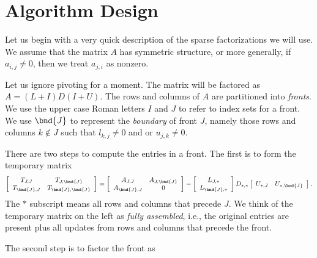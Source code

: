 \par
\chapter{Algorithm Design}
\label{chapter:algorithmDesign}
\par
Let us begin with a very quick description of the sparse
factorizations we will use.
We assume that the matrix $A$ has symmetric structure, or more
generally, if $a_{i,j} \ne 0$, then we treat $a_{j,i}$ as nonzero.
\par
Let us ignore pivoting for a moment.
The matrix will be factored as $A = (L+I)D(I+U)$.
The rows and columns of $A$ are partitioned into {\it fronts}.
We use the upper case Roman letters $I$ and $J$ to refer to
index sets for a front.
We use $\bnd{J}$ to represent the {\it boundary} of front $J$,
namely those rows and columns $k \notin J$ 
such that $l_{k,j} \ne 0$ and or $u_{j,k} \ne 0$.
\par
There are two steps to compute the entries in a front.
The first is to form the temporary matrix
\begin{equation}
\label{alg:eqn:1}
\left \lbrack \begin{array}{cc}
T_{J,J} & T_{J, \bnd{J}} \\
T_{\bnd{J},J} & T_{\bnd{J},\bnd{J}}
\end{array} \right \rbrack
=
\left \lbrack \begin{array}{cc}
A_{J,J} & A_{J, \bnd{J}} \\
A_{\bnd{J},J} & 0
\end{array} \right \rbrack
-
\left \lbrack \begin{array}{c}
L_{J,*} \\
L_{\bnd{J},*}
\end{array} \right \rbrack
D_{*,*} 
\left \lbrack \begin{array}{cc}
U_{*,J} & U_{*,\bnd{J}}
\end{array} \right \rbrack.
\end{equation}
The $*$ subscript means all rows and columns that precede $J$.
We think of the temporary matrix on the left
as {\it fully assembled}, i.e.,
the original entries are present plus all updates from rows and
columns that precede the front.
\par
The second step is to factor the front as
